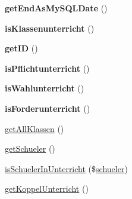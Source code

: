 \begin{DoxyCompactItemize}
{\bfseries get\+End\+As\+My\+S\+Q\+L\+Date} ()
\item 
\mbox{\label{class_schueler_unterricht_ad6849c7e9c11e01c8fdfadc86e18db13}} 
{\bfseries is\+Klassenunterricht} ()
\item 
\mbox{\label{class_schueler_unterricht_add571ebb2e6883978c2cf4c7bd54d047}} 
{\bfseries get\+ID} ()
\item 
\mbox{\label{class_schueler_unterricht_a5593ffe974e9ee97b2934d58c489e980}} 
{\bfseries is\+Pflichtunterricht} ()
\item 
\mbox{\label{class_schueler_unterricht_a36371d1606c39c96615587dc1a0f91c1}} 
{\bfseries is\+Wahlunterricht} ()
\item 
\mbox{\label{class_schueler_unterricht_a280e2d2138ad550253eb5bc8d350040f}} 
{\bfseries is\+Forderunterricht} ()
\item 
\mbox{\hyperlink{class_schueler_unterricht_a5a7367ad075083f4a1c945f795809c0c}{get\+All\+Klassen}} ()
\item 
\mbox{\hyperlink{class_schueler_unterricht_a58a9398c18546bf70e74081527bbe46f}{get\+Schueler}} ()
\item 
\mbox{\hyperlink{class_schueler_unterricht_ada7eeec8566c83f7b4b2a401b53733e6}{is\+Schueler\+In\+Unterricht}} (\$\mbox{\hyperlink{classschueler}{schueler}})
\item 
\mbox{\hyperlink{class_schueler_unterricht_a109cdab0686a171d97cd3598d864a6c9}{get\+Koppel\+Unterricht}} ()
\end{DoxyCompactItemize}
